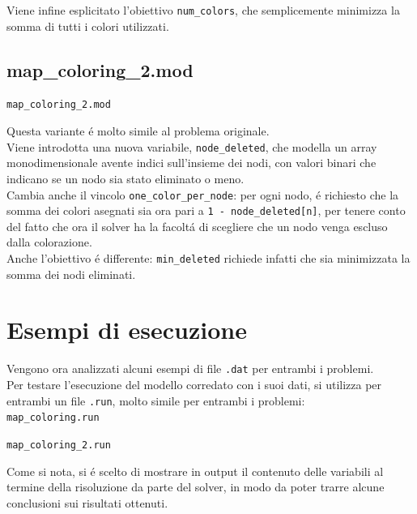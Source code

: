 \documentclass{article}
\begin{document}
Viene infine esplicitato l'obiettivo \texttt{num\_colors}, che semplicemente minimizza la somma di tutti i colori utilizzati.\\
\pagebreak

\subsection{map\_coloring\_2.mod}
\texttt{map\_coloring\_2.mod}


\vspace{5mm}

Questa variante \'e molto simile al problema originale.\\
Viene introdotta una nuova variabile, \texttt{node\_deleted}, che modella un array monodimensionale avente indici sull'insieme dei nodi, con valori binari che indicano se un nodo sia stato eliminato o meno.\\

Cambia anche il vincolo \texttt{one\_color\_per\_node}: per ogni nodo, \'e richiesto che la somma dei colori asegnati sia ora pari a \texttt{1 - node\_deleted[n]}, per tenere conto del fatto che ora il solver ha la facolt\'a di scegliere che un nodo venga escluso dalla colorazione.\\

Anche l'obiettivo \'e differente: \texttt{min\_deleted} richiede infatti che sia minimizzata la somma dei nodi eliminati.\\
\pagebreak

\section{Esempi di esecuzione}
Vengono ora analizzati alcuni esempi di file \texttt{.dat} per entrambi i problemi.\\
Per testare l'esecuzione del modello corredato con i suoi dati, si utilizza per entrambi un file \texttt{.run}, molto simile per entrambi i problemi:\\

\texttt{map\_coloring.run}


\vspace{5mm}

\texttt{map\_coloring\_2.run}


\vspace{5mm}

Come si nota, si \'e scelto di mostrare in output il contenuto delle variabili al termine della risoluzione da parte del solver, in modo da poter trarre alcune conclusioni sui risultati ottenuti.\\
\end{document}
